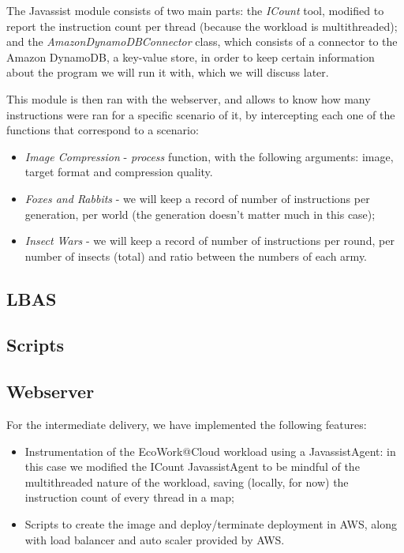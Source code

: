 \documentclass{article}
\begin{document}
The Javassist module consists of two main parts: the \textit{ICount} tool,
modified to report the instruction count per thread (because the workload is
multithreaded); and the \textit{AmazonDynamoDBConnector} class, which consists
of a connector to the Amazon DynamoDB, a key-value store, in order to keep
certain information about the program we will run it with, which we will discuss
later.

This module is then ran with the webserver, and allows to know how many
instructions were ran for a specific scenario of it, by intercepting each one of
the functions that correspond to a scenario:

\begin{itemize}
    \item \textit{Image Compression} - \textit{process} function, with the
        following arguments: image, target format and compression quality.
    \item \textit{Foxes and Rabbits} - we will keep a record of number of
        instructions per generation, per world (the generation doesn't matter
        much in this case);
    \item \textit{Insect Wars} - we will keep a record of number of instructions
        per round, per number of insects (total) and ratio between the numbers
        of each army.
\end{itemize}

\subsection{LBAS}


\subsection{Scripts}


\subsection{Webserver}

For the intermediate delivery, we have implemented the following features:
\begin{itemize}
    \item Instrumentation of the EcoWork@Cloud workload using a JavassistAgent:
        in this case we modified the ICount JavassistAgent to be mindful of the
        multithreaded nature of the workload, saving (locally, for now) the
        instruction count of every thread in a map;
    \item Scripts to create the image and deploy/terminate deployment in AWS,
        along with load balancer and auto scaler provided by AWS.
\end{itemize}
\end{document}
